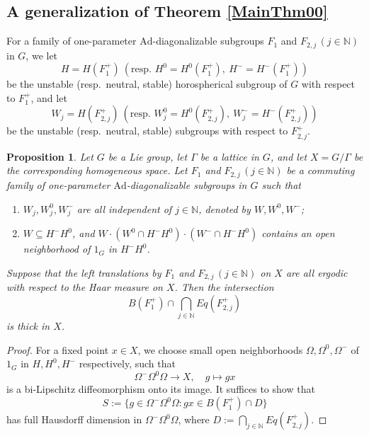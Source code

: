\documentclass[reqno,12pt]{amsart}
\newtheorem{proposition}[theorem]{Proposition}
\theoremstyle{definition}
\numberwithin{equation}{section}
\newcommand{\NN}{\mathbb{N}}
\newcommand{\Ad}{\mathrm{Ad}}
\newcommand {\new}[1]   {\textcolor{blue}{#1}}
\begin{document}
{%

\subsection{A generalization of Theorem \ref{MainThm00}} \label{general}    
For {a family of} one-parameter $\Ad$-diagonalizable subgroups $F_1$ and $F_{2,j}\,(j\in\NN)$ in $G$, we {let} $$H=H(F_1^+)\ (\text{resp.\ } H^0=H^0(F_1^+), \ H^-=H^-(F_1^+))$$ be the unstable (resp.\ neutral, stable) horospherical subgroup of $G$ with respect to $F_1^+$, and let $$W_j=H(F_{2,j}^+)\ (\text{resp.\ } W_j^0=H^0(F_{2,j}^+), \ W_j^-=H^-(F_{2,j}^+))$$  be the unstable (resp.\ neutral, stable) %
subgroups %
with respect to $F_{2,j}^+$.

\begin{proposition}\label{P:Thm0}
    Let $G$ be a Lie group, let $\Gamma$ be a lattice in $G$, and let $X=G/\Gamma$ be the corresponding homogeneous space. Let $F_1$ and $F_{2,j}\,(j\in\NN)$ be a commuting family of one-parameter $\mathrm{Ad}$-diagonalizable subgroups in $G$  such that 
 {\begin{enumerate}
        \item[\rm (1)] $W_j,W_j^0,W_j^-$ are all independent of $j\in\NN$, denoted by $W,W^0,W^-$;
        \item[\rm (2)] $W\subseteq H^-H^0$, and $W\cdot (W^0\cap H^-H^0)\cdot (W^-\cap H^-H^0)$ contains an open neighborhood of $1_G$ in $H^-H^0$.
    \end{enumerate}
    }
    Suppose that the left translations by $F_1$ and $F_{2,j}\,(j\in\NN)$ on $X$ are all ergodic with respect to the Haar measure on $X$. Then the intersection 
    $$
    B(F_1^+)\cap \bigcap_{j\in\NN}Eq(F_{2,j}^+)
    $$
    is thick in $X$.
\end{proposition}

\begin{proof}
    For a fixed point $x\in X$, we choose small open neighborhoods $\Omega,\Omega^0,\Omega^-$ of $1_G$ in $H,H^0,H^-$ respectively, such that $$
    \Omega^-\Omega^0\Omega\to X,\quad g\mapsto gx
    $$ is a bi-Lipschitz diffeomorphism onto its image. It suffices to show that $$
    S:=\{g\in \Omega^-\Omega^0\Omega: gx\in B(F_1^+)\cap D\}
    $$
    has full Hausdorff dimension in $\Omega^-\Omega^0\Omega$, where $D:=\bigcap_{j\in\NN}Eq(F_{2,j}^+)$.


\end{proof}}
\end{document}
